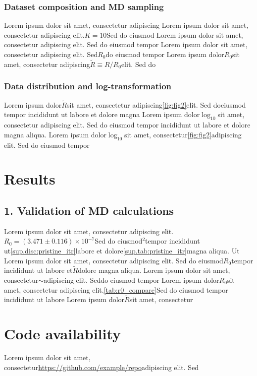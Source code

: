 \documentclass{article}
\begin{document}
\subsubsection*{Dataset composition and MD sampling}
Lorem ipsum dolor sit amet, consectetur adipiscing
Lorem ipsum dolor sit amet, consectetur adipiscing elit.$K = 10$Sed do eiusmod
Lorem ipsum dolor sit amet, consectetur adipiscing elit. Sed do eiusmod tempor
Lorem ipsum dolor sit amet, consectetur adipiscing elit. Sed$R_0$do eiusmod tempor
Lorem ipsum dolor$R_0$sit amet, consectetur adipiscing$\widetilde{R} \equiv R/R_0$elit. Sed do

\subsubsection*{Data distribution and log-transformation}
Lorem ipsum dolor$\widetilde{R}$sit amet, consectetur adipiscing\ref{fig:fig2}elit. Sed doeiusmod tempor incididunt ut labore et dolore magna
Lorem ipsum dolor$\log_{10}$sit amet, consectetur adipiscing elit. Sed do eiusmod tempor incididunt ut labore et dolore magna aliqua.
Lorem ipsum dolor$\log_{10}$sit amet, consectetur\ref{fig:fig2}adipiscing elit. Sed do eiusmod tempor

\section*{Results}\label{results}

\subsection*{1. Validation of MD calculations}

Lorem ipsum dolor sit amet, consectetur adipiscing elit.$R_0 = (3.471 \pm 0.116) \times 10^{-7}$Sed do eiusmod$^2$tempor incididunt ut\ref{sup.disc:pristine_itr}labore et dolore\ref{sup.tab:pristine_itr}magna aliqua. Ut
Lorem ipsum dolor sit amet, consectetur adipiscing elit. Sed do eiusmod$R_0$tempor incididunt ut labore et$\widetilde{R}$dolore magna aliqua.
Lorem ipsum dolor sit amet, consectetur$\sim$adipiscing elit. Seddo eiusmod tempor
Lorem ipsum dolor$R_0$sit amet, consectetur adipiscing elit.\ref{tab:r0_compare}Sed do eiusmod tempor incididunt ut labore
Lorem ipsum dolor$\widetilde{R}$sit amet, consectetur

\newpage
\section*{Code availability}
Lorem ipsum dolor sit amet, consectetur\url{https://github.com/example/repo}adipiscing elit. Sed
\end{document}
